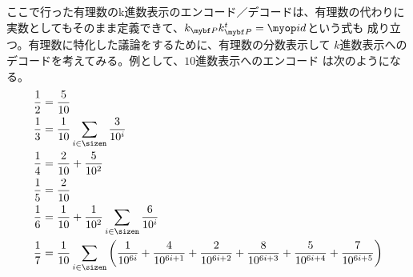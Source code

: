 	ここで行った有理数のk進数表示のエンコード／デコードは、有理数の代わりに
	実数としてもそのまま定義できて、$k_\bunsub k_\bunsub^t=\id$という式も
	成り立つ。有理数に特化した議論をするために、有理数の分数表示して
	$k$進数表示へのデコードを考えてみる。例として、$10$進数表示へのエンコード
	は次のようになる。
	\begin{equation*}\begin{split}
		\frac{1}{2} &= \frac{5}{10} \\
		\frac{1}{3} &= \frac{1}{10}\sum_{i\in\sizen}\frac{3}{10^i} \\
		\frac{1}{4} &= \frac{2}{10} + \frac{5}{10^2} \\
		\frac{1}{5} &= \frac{2}{10} \\
		\frac{1}{6} &= \frac{1}{10} + \frac{1}{10^2}\sum_{i\in\sizen}\frac{6}{10^i} \\
		\frac{1}{7} &= \frac{1}{10}\sum_{i\in\sizen}\left(
			\frac{1}{10^{6i}} + \frac{4}{10^{6i+1}} + \frac{2}{10^{6i+2}} 
			+ \frac{8}{10^{6i+3}} + \frac{5}{10^{6i+4}} + \frac{7}{10^{6i+5}}
			\right) \\
	\end{split}\end{equation*}

